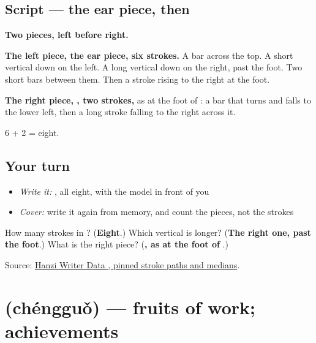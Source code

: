 \subsection*{Script — the ear piece, then }

\begin{quote}
\end{quote}

\textbf{Two pieces, left before right.}

\textbf{The left piece, the ear piece, six strokes.} A bar across the top. A short vertical down on the left. A long vertical down on the right, past the foot. Two short bars between them. Then a stroke rising to the right at the foot.

\textbf{The right piece, , two strokes,} as at the foot of : a bar that turns and falls to the lower left, then a long stroke falling to the right across it.

6 + 2 = eight.

\subsection*{Your turn}
\begin{itemize}
\raggedright
  \item \emph{Write it:} , all eight, with the model in front of you
  \item \emph{Cover:} write it again from memory, and count the pieces, not the strokes
\end{itemize}

\begin{tcolorbox}[breakable,colback=teal!4,colframe=teal!35!black,title={Before you move on}]
How many strokes in ? (\textbf{Eight}.) Which vertical is longer? (\textbf{The right one, past the foot}.) What is the right piece? (\textbf{, as at the foot of }.)

Source: \href{https://raw.githubusercontent.com/chanind/hanzi-writer-data/68d10a4b21150cae5e1ebbd223eed289cf32d90c/data/\%E5\%8F\%96.json}{Hanzi Writer Data , pinned stroke paths and medians}.
\end{tcolorbox}
\section[\texorpdfstring{\zh{成果} (chéngguǒ)}{成果 (chéngguǒ)}]{ (chéngguǒ) — fruits of work; achievements}

